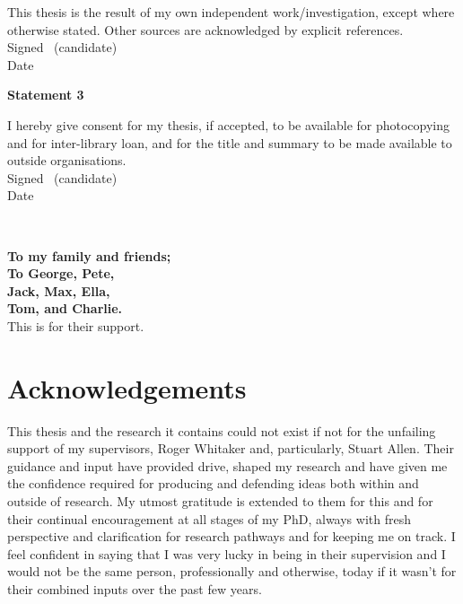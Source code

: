 This thesis is the result of my own independent work/investigation,
except where otherwise stated. Other sources are acknowledged by
explicit references.\\[2ex]
Signed \dotfill \ (candidate) \hspace*{10em}\\[1ex]
Date\ \ \ \ \ \dotfill \hspace*{18em}

\vfill

\textbf{\large Statement 3}

I hereby give consent for my thesis, if accepted, to be available for photocopying and for inter-library loan,
 and for the title and summary to be made available to outside organisations.\\[2ex]
Signed \dotfill \ (candidate) \hspace*{10em}\\[1ex]
Date\ \ \ \ \ \dotfill \hspace*{18em}

\vfill

\cleardoublepage




\ \vspace*{1.11cm}
\begin{flushright}
\textbf{\large To my family and friends;}\\
\textbf{\large To George, Pete,}\\
\textbf{\large Jack, Max, Ella,}\\
\textbf{\large Tom, and Charlie.}\\
\large This is for their support.
\end{flushright}
\newpage
\markboth{}{}
\cleardoublepage

\chapter*{Acknowledgements}
This thesis and the research it contains could not exist if not for the unfailing support of my supervisors, Roger Whitaker and, particularly, Stuart Allen. Their guidance and input have provided drive, shaped my research and have given me the confidence required for producing and defending ideas both within and outside of research. My utmost gratitude is extended to them for this and for their continual encouragement at all stages of my PhD, always with fresh perspective and clarification for research pathways and for keeping me on track. I feel confident in saying that I was very lucky in being in their supervision and I would not be the same person, professionally and otherwise, today if it wasn't for their combined inputs over the past few years.

